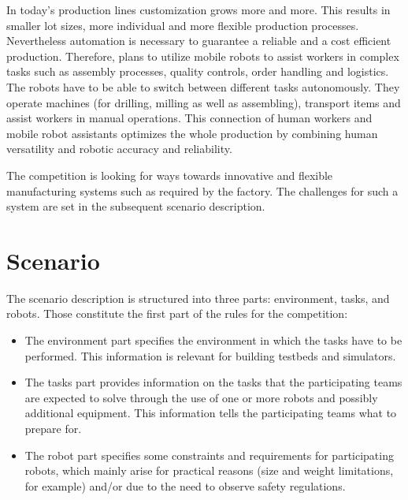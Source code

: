 In today's production lines customization grows more and more. 
This results in smaller lot sizes, more individual and more flexible production processes. 
Nevertheless automation is necessary to guarantee a reliable and a cost efficient production.
Therefore, \rollin plans to utilize mobile robots to assist workers in complex  tasks such as assembly processes, quality controls, order handling and logistics. 
The robots have to be able to switch between different tasks autonomously. They operate machines (for drilling, milling as well as assembling), transport items and assist workers in manual operations. 
This connection of human workers and mobile robot assistants optimizes the whole production by combining human versatility and robotic accuracy and reliability.

The \erlir competition is looking for ways towards innovative and flexible manufacturing systems such as required by the \rollin factory. The challenges for such a system are set in the subsequent scenario description.


\clearpage
{}
\section{\erlir Scenario}

The \erlir scenario description is structured into three parts: environment, tasks, and robots. Those constitute the first part of the rules for the competition:
%
\begin{itemize}
\item The environment part specifies the environment in which the tasks have to be performed. This information is relevant for building testbeds and simulators.
\item The tasks part provides information on the tasks that the participating teams are expected to solve through the use of one or more robots and possibly additional equipment. 
This information tells the participating teams what to prepare for.
\item The robot part specifies some constraints and requirements for participating robots, which mainly arise for practical reasons (size and weight limitations, for example) and/or due to the need to observe safety regulations.
\end{itemize}

